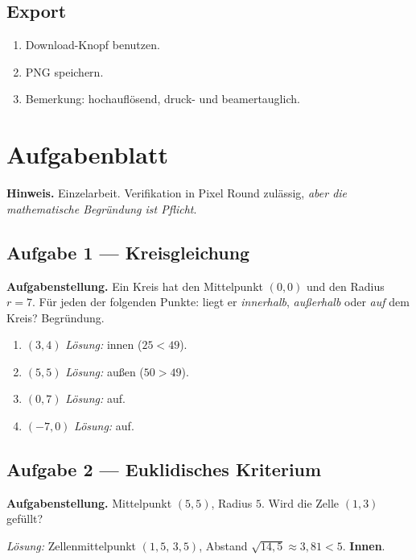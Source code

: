 \documentclass[12pt,a4paper]{scrartcl}
\newcommand{\acc}[1]{\textcolor{accent}{\textbf{#1}}}
\begin{document}
\subsection{Export}
\begin{enumerate}[leftmargin=1.5em,itemsep=0.15em,topsep=0.3em]
  \item Download-Knopf benutzen.
  \item PNG speichern.
  \item Bemerkung: hochauflösend, druck- und beamertauglich.
\end{enumerate}

\newpage
\section{Aufgabenblatt}\label{ap:auf}

\textbf{Hinweis.} Einzelarbeit. Verifikation in Pixel Round zulässig, \emph{aber die mathematische Begründung ist Pflicht}.

\subsection*{Aufgabe 1 --- Kreisgleichung}
\textbf{Aufgabenstellung.} Ein Kreis hat den Mittelpunkt $(0, 0)$ und den Radius $r = 7$. Für jeden der folgenden Punkte: liegt er \emph{innerhalb}, \emph{außerhalb} oder \emph{auf} dem Kreis? Begründung.
\begin{enumerate}[label=\alph*),leftmargin=1.5em,itemsep=0.1em,topsep=0.2em,nosep]
  \item $(3, 4)$ \hfill \emph{Lösung:} innen ($25 < 49$).
  \item $(5, 5)$ \hfill \emph{Lösung:} außen ($50 > 49$).
  \item $(0, 7)$ \hfill \emph{Lösung:} auf.
  \item $(-7, 0)$ \hfill \emph{Lösung:} auf.
\end{enumerate}

\subsection*{Aufgabe 2 --- Euklidisches Kriterium}
\textbf{Aufgabenstellung.} Mittelpunkt $(5, 5)$, Radius $5$. Wird die Zelle $(1, 3)$ gefüllt?

\emph{Lösung:} Zellenmittelpunkt $(1{,}5,\, 3{,}5)$, Abstand $\sqrt{14{,}5} \approx 3{,}81 < 5$. \acc{Innen}.
\end{document}
